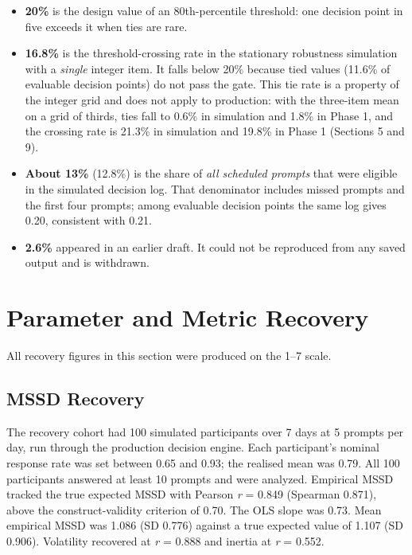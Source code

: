 \documentclass[11pt,letterpaper]{article}
\begin{document}
\begin{itemize}
    \item \textbf{20\%} is the design value of an 80th-percentile threshold: one decision point in five exceeds it when ties are rare.
    \item \textbf{16.8\%} is the threshold-crossing rate in the stationary robustness simulation with a \emph{single} integer item. It falls below 20\% because tied values (11.6\% of evaluable decision points) do not pass the gate. This tie rate is a property of the integer grid and does not apply to production: with the three-item mean on a grid of thirds, ties fall to 0.6\% in simulation and 1.8\% in Phase 1, and the crossing rate is 21.3\% in simulation and 19.8\% in Phase 1 (Sections 5 and 9).
    \item \textbf{About 13\%} (12.8\%) is the share of \emph{all scheduled prompts} that were eligible in the simulated decision log. That denominator includes missed prompts and the first four prompts; among evaluable decision points the same log gives 0.20, consistent with 0.21.
    \item \textbf{2.6\%} appeared in an earlier draft. It could not be reproduced from any saved output and is withdrawn.
\end{itemize}

\section{Parameter and Metric Recovery}

All recovery figures in this section were produced on the 1--7 scale.

\subsection{MSSD Recovery}

The recovery cohort had 100 simulated participants over 7 days at 5 prompts per day, run through the production decision engine. Each participant's nominal response rate was set between 0.65 and 0.93; the realised mean was 0.79. All 100 participants answered at least 10 prompts and were analyzed. Empirical MSSD tracked the true expected MSSD with Pearson \textit{r} = 0.849 (Spearman 0.871), above the construct-validity criterion of 0.70. The OLS slope was 0.73. Mean empirical MSSD was 1.086 (SD 0.776) against a true expected value of 1.107 (SD 0.906). Volatility recovered at \textit{r} = 0.888 and inertia at \textit{r} = 0.552.
\end{document}

